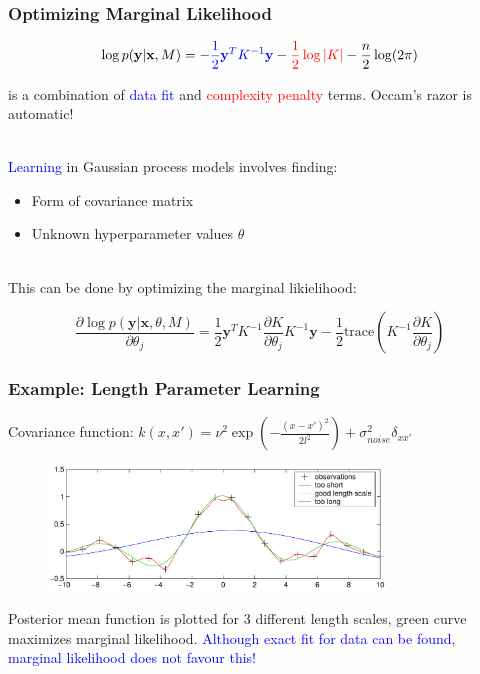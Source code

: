 \documentclass[10pt]{beamer}
\newcommand{\bx}{\mathbf{x}}
\newcommand{\by}{\mathbf{y}}
\begin{document}
  \begin{frame}
    \frametitle{Optimizing Marginal Likelihood}
    \begin{equation*}
      \log p(\by|\bx,M) = - \textcolor{blue}{\frac{1}{2} \by^T K^{-1} \by} - \textcolor{red}{\frac{1}{2} \log|K|} - \frac{n}{2} \log (2\pi)
    \end{equation*}

    is a combination of \textcolor{blue}{data fit} and \textcolor{red}{complexity penalty} terms. Occam's razor is automatic!\\~\\

    \pause

    \textcolor{blue}{Learning} in Gaussian process models involves finding:
      \begin{itemize}
        \item Form of covariance matrix
        \item Unknown hyperparameter values $\theta$
      \end{itemize}

    \pause

    ~\\ This can be done by optimizing the marginal likielihood:

    \begin{equation*}
      \frac{\partial \log p(\by|\bx,\theta,M)}{\partial \theta_j} = \frac{1}{2} \by^T K^{-1} \frac{\partial K}{\partial \theta_j} K^{-1} \by - \frac{1}{2} \text{trace} \left( K^{-1} \frac{\partial K}{\partial \theta_j} \right)
    \end{equation*}
  \end{frame}

  \begin{frame}
    \frametitle{Example: Length Parameter Learning}

    Covariance function: $k(x,x') = \nu^2 \exp \left( - \frac{(x - x')^2}{2l^2} \right) + \sigma_{noise}^2 \delta_{xx'}$

    \begin{figure}
      \centering
      \includegraphics[width=0.8\textwidth]{gpLearning.png}
    \end{figure}

    Posterior mean function is plotted for 3 different length scales, green curve maximizes marginal likelihood. \textcolor{blue}{Although exact fit for data can be found, marginal likelihood does not favour this!}
  \end{frame}
\end{document}
